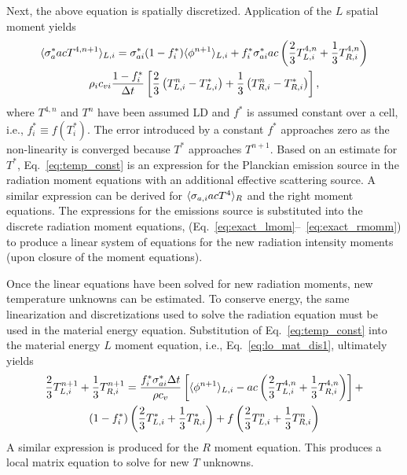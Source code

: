 Next, the above equation is spatially discretized.  Application of the $L$ spatial
moment yields
\begin{multline}\label{eq:temp_const}
    \langle \sigma_a^* a c T^{4,n+1} \rangle_{L,i} = \sigma^*_{ai}(1-f_i^*)\langle \phi^{n+1} \rangle_{L,i} +
    f_i^*
    \sigma^*_{ai} a c \left(\frac{2}{3} T_{L,i}^{4,n} + \frac{1}{3} T_{R,i}^{4,n}\right)
    \\ \rho_i c_{vi} \frac{1 - f^*_i}{\Delta t} \left[\frac{2}{3}\left(T^n_{L,i} -
        T^*_{L,i}\right) + \frac{1}{3}\left(T^n_{R,i} -
    T^*_{R,i}\right)\right],
\end{multline}
where $T^{4,n}$ and $T^{n}$ have been assumed LD and $f^*$ is assumed constant over a cell, i.e., $f^*_i
\equiv f(T_i^*)$.
The error introduced by a constant $f^*$ approaches zero as the
non-linearity is converged because $T^*$ approaches $T^{n+1}$. 
Based on an estimate for $T^*$, Eq.~\eqref{eq:temp_const} is an expression for
the Planckian emission source in the radiation moment equations with an additional effective scattering source.
A similar expression can be derived for $\langle \sigma_{a,i} a c T^4 \rangle_R$ and the right
moment equations.
The expressions for the emissions source is substituted into the discrete radiation moment equations,
(Eq.~\eqref{eq:exact_lmom}--~\eqref{eq:exact_rmomm}) to produce a
linear system of equations for the new radiation intensity moments (upon closure of the moment equations). 

Once the linear equations have been solved for new radiation moments, new temperature
unknowns can be estimated.  To conserve energy, the same linearization and discretizations used to
solve the radiation equation must be used in the material energy equation.
Substitution of Eq.~\eqref{eq:temp_const} into the material energy $L$ moment equation, i.e., Eq.~\eqref{eq:lo_mat_dis1},
ultimately yields
\begin{multline}\label{eq:new_temp}
    \frac{2}{3}T_{L,i}^{n+1} + \frac{1}{3}T_{R,i}^{n+1}= \frac{f_i^* \sigma_{ai}^* \Delta
t}{\rho c_{v}}  \left[ \langle \phi^{n+1} \rangle_{L,i}  - a c\left(\frac{2}{3} T_{L,i}^{4,n} + \frac{1}{3} T_{R,i}^{4,n}\right)
\right] + \\ (1- f^*_{i})\left(\frac{2}{3}T^*_{L,i} + \frac{1}{3}T^*_{R,i}\right) + f
\left(\frac{2}{3}T^n_{L,i} + \frac{1}{3}T^n_{R,i}\right)
\end{multline}
A similar expression is produced for the $R$ moment equation.  This produces a local
matrix equation to solve for new $T$ unknowns.  

